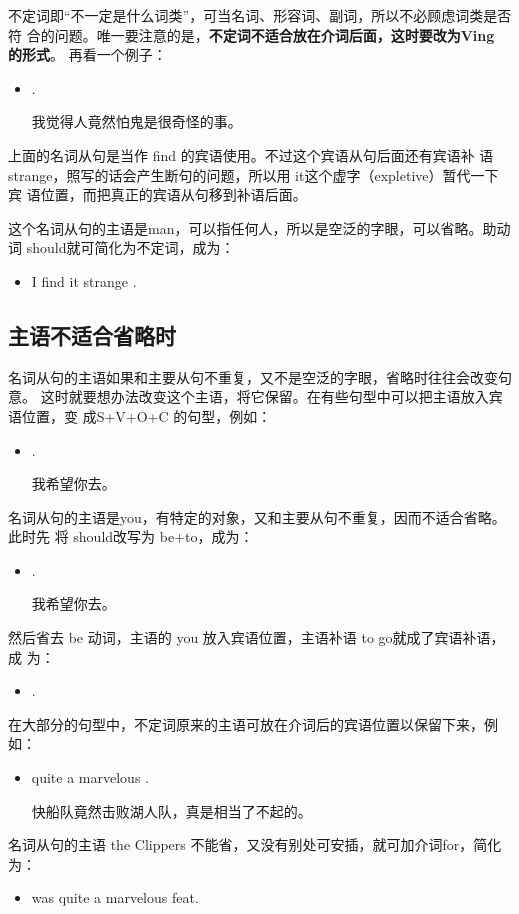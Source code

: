 不定词即“不一定是什么词类”，可当名词、形容词、副词，所以不必顾虑词类是否符
合的问题。唯一要注意的是，\textbf{不定词不适合放在介词后面，这时要改为Ving 的形式}。
再看一个例子：
\begin{itemize}
\item {}    .

  我觉得人竟然怕鬼是很奇怪的事。
\end{itemize}
上面的名词从句是当作 find 的宾语使用。不过这个宾语从句后面还有宾语补
语strange，照写的话会产生断句的问题，所以用 it这个虚字（expletive）暂代一下宾
语位置，而把真正的宾语从句移到补语后面。

这个名词从句的主语是man，可以指任何人，所以是空泛的字眼，可以省略。助动
词 should就可简化为不定词，成为：
\begin{itemize}
\item I find it strange .
\end{itemize}

\subsection{主语不适合省略时}

名词从句的主语如果和主要从句不重复，又不是空泛的字眼，省略时往往会改变句意。
这时就要想办法改变这个主语，将它保留。在有些句型中可以把主语放入宾语位置，变
成S+V+O+C 的句型，例如：
\begin{itemize}
\item {}  .

  我希望你去。
\end{itemize}
名词从句的主语是you，有特定的对象，又和主要从句不重复，因而不适合省略。此时先
将 should改写为 be+to，成为：
\begin{itemize}
\item {}  .

  我希望你去。
\end{itemize}
然后省去 be 动词，主语的 you 放入宾语位置，主语补语 to go就成了宾语补语，成
为：
\begin{itemize}
\item {}   .
\end{itemize}

在大部分的句型中，不定词原来的主语可放在介词后的宾语位置以保留下来，例如：
\begin{itemize}
\item {}  quite a marvelous .

  快船队竟然击败湖人队，真是相当了不起的。
\end{itemize}
名词从句的主语 the Clippers 不能省，又没有别处可安插，就可加介词for，简化
为：
\begin{itemize}
\item {} was quite a marvelous feat.
\end{itemize}

